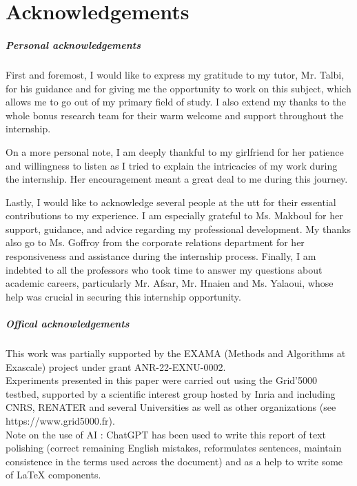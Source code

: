 \chapter*{Acknowledgements}

\paragraph{Personal acknowledgements}

First and foremost, I would like to express my gratitude to my tutor, Mr. Talbi, for his guidance and for giving me the opportunity to work on this subject, which allows me to go out of my primary field of study. I also extend my thanks to the whole \acrshort{bonus} research team for their warm welcome and support throughout the internship.  

On a more personal note, I am deeply thankful to my girlfriend for her patience and willingness to listen as I tried to explain the intricacies of my work during the internship. Her encouragement meant a great deal to me during this journey.  

Lastly, I would like to acknowledge several people at the \gls{utt} for their essential contributions to my experience. I am especially grateful to Ms. Makboul for her support, guidance, and advice regarding my professional development. My thanks also go to Ms. Goffroy from the corporate relations department for her responsiveness and assistance during the internship process. Finally, I am indebted to all the professors who took time to answer my questions about academic careers, particularly Mr. Afsar, Mr. Hnaien and Ms. Yalaoui, whose help was crucial in securing this internship opportunity.


\paragraph{Offical acknowledgements}
This work was partially supported by the EXAMA (Methods and Algorithms at Exascale) project under grant ANR-22-EXNU-0002.\\ 

Experiments presented in this paper were carried out using the Grid'5000 testbed, supported by a scientific interest group hosted by Inria and including CNRS, RENATER and several Universities as well as other organizations (see https://www.grid5000.fr).\\

Note on the use of AI : ChatGPT has been used to write this report of text polishing (correct remaining English mistakes, reformulates sentences, maintain consistence in the terms used across the document) and as a help to write some of \LaTeX{} components.